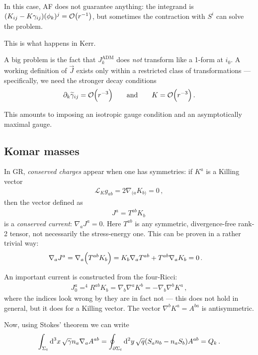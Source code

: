\documentclass[main.tex]{subfiles}
\begin{document}
In this case, AF does not guarantee anything: the integrand is \((K_{ij} - K \gamma_{ij}) (\phi_{k})^{j} = \order{r^{-1}}\), but sometimes the contraction with \(S^{i}\) can solve the problem. 

This is what happens in Kerr.

A big problem is the fact that \(J_k^{\text{ADM}}\) does \emph{not} transform like a 1-form at \(i_0 \). 
A working definition of \(\vec{J}\) exists only within a restricted class of transformations --- specifically, we need the stronger decay conditions
%
\begin{align}
\partial_{k} \widetilde{\gamma}_{ij} = \order{r^{-3}} \qquad \text{and} \qquad
K = \order{r^{-3}}
\,.
\end{align}

This amounts to imposing an isotropic gauge condition and an asymptotically maximal gauge.

\subsection{Komar masses}

In GR, \emph{conserved charges} appear when one has symmetries: if \(K^{a}\) is a Killing vector 
%
\begin{align}
\mathscr{L}_K g_{ab} = 2 \nabla_{(a} K_{b)} = 0
\,,
\end{align}
%
then the vector defined as
%
\begin{align}
J^{a} = T^{ab} K_b
\,
\end{align}
%
is a \emph{conserved current}: \(\nabla_a J^{a} = 0\). 
Here \(T^{ab}\) is any symmetric, divergence-free rank-2 tensor, not necessarily the stress-energy one. 
This can be proven in a rather trivial way: 
%
\begin{align}
\nabla_a J^{a} &= \nabla_a \qty(T^{ab} K_b) =  K_b \nabla_a T^{ab} + T^{ab} \nabla_a K_b = 0
\,.
\end{align}

An important current is constructed from the four-Ricci: 
%
\begin{align}
J^{a}_0 = ^4 R^{ab} K_b = \nabla_b \nabla^{a} K^{b} = - \nabla_b \nabla^{b} K^{a} 
\,,
\end{align}
%
where the indices look wrong by they are in fact not --- this does not hold in general, but it does for a Killing vector. The vector \(\nabla^{b} K^{a} = A^{ba}\) is antisymmetric. 

Now, using Stokes' theorem we can write 
%
\begin{align}
\int_{\Sigma _t} \dd[3]{x} \sqrt{\gamma } n_a \nabla_a A^{ab} 
= \oint _{\partial \Sigma _t} \dd[2]{y} \sqrt{q} \qty(S_a n_b - n_a S_b) A^{ab}  = Q_k
\,.
\end{align}
\end{document}
